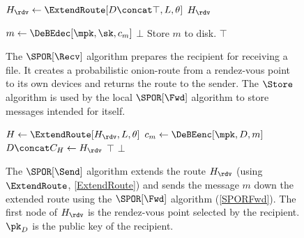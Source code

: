 
\begin{figure}
  \begin{algorithmic}
      \State $H_\rdv\gets \ExtendRoute[D\concat \top, L, \theta]$
      \State \Return $H_\rdv$
    \EndFunction

      \State $m\gets \DeBEdec[\mpk, \sk, c_m]$
        \State \Return $\bot$
      \EndIf
      \State Store $m$ to disk.
      \State \Return $\top$
    \EndFunction
  \end{algorithmic}
  \caption{\label{SPORRecv}%
    The \(\SPOR[\Recv]\) algorithm prepares the recipient for receiving a file.
    It creates a probabilistic onion-route from a rendez-vous point to its own 
    devices and returns the route to the sender.
    The \(\Store\) algorithm is used by the local \(\SPOR[\Fwd]\) algorithm to 
    store messages intended for itself.
  }
\end{figure}

\begin{figure}
  \begin{algorithmic}
      \State $H\gets \ExtendRoute[H_\rdv, L, \theta]$
      \State $c_m\gets \DeBEenc[\mpk, D, m]$
      \State $D\concat C_H\gets H_\rdv$
          \State \Return $\top$
        \EndIf
      \EndFor
      \State \Return $\bot$
    \EndFunction
  \end{algorithmic}
  \caption{\label{SPORSend}%
    The \(\SPOR[\Send]\) algorithm extends the route \(H_\rdv\) (using 
    \(\ExtendRoute\), \cref{ExtendRoute}) and sends the message \(m\) down the 
    extended route using the \(\SPOR[\Fwd]\) algorithm (\cref{SPORFwd}).
    The first node of \(H_\rdv\) is the rendez-vous point selected by the 
    recipient.
    \(\pk_D\) is the public key of the recipient.
  }
\end{figure}

